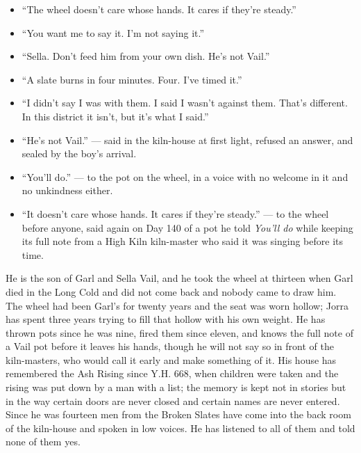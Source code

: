 \documentclass{design/chronicle}
\begin{document}
{\begin{itemize}[leftmargin=1.4em,itemsep=1pt,topsep=3pt,parsep=0pt]
\item “The wheel doesn’t care whose hands. It cares if they’re steady.”

\item “You want me to say it. I’m not saying it.”

\item “Sella. Don’t feed him from your own dish. He’s not Vail.”

\item “A slate burns in four minutes. Four. I’ve timed it.”

\item “I didn’t say I was with them. I said I wasn’t against them. That’s different. In this district it isn’t, but it’s what I said.”

\item “He’s not Vail.” --- said in the kiln-house at first light, refused an answer, and sealed by the boy’s arrival.

\item “You’ll do.” --- to the pot on the wheel, in a voice with no welcome in it and no unkindness either.

\item “It doesn’t care whose hands. It cares if they’re steady.” --- to the wheel before anyone, said again on Day 140 of a pot he told \emph{You’ll do} while keeping its full note from a High Kiln kiln-master who said it was singing before its time.

\end{itemize}

He is the son of Garl and Sella Vail, and he took the wheel at thirteen when Garl died in the Long Cold and did not come back and nobody came to draw him. The wheel had been Garl’s for twenty years and the seat was worn hollow; Jorra has spent three years trying to fill that hollow with his own weight. He has thrown pots since he was nine, fired them since eleven, and knows the full note of a Vail pot before it leaves his hands, though he will not say so in front of the kiln-masters, who would call it early and make something of it. His house has remembered the Ash Rising since Y.H. 668, when children were taken and the rising was put down by a man with a list; the memory is kept not in stories but in the way certain doors are never closed and certain names are never entered. Since he was fourteen men from the Broken Slates have come into the back room of the kiln-house and spoken in low voices. He has listened to all of them and told none of them yes.

}
\end{document}
